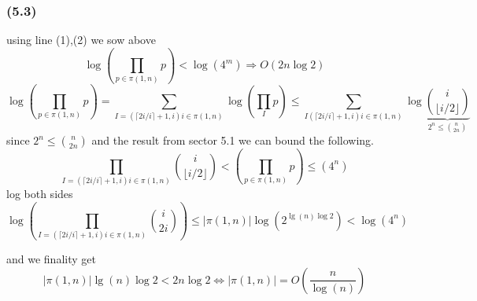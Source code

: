 \documentclass[12pt]{article}
\begin{document}
\subsubsection*{(5.3)}
using line (1),(2) we sow above 
\[ \log\left(\prod\limits_{p\in \pi(1,n)}p\right)< \log(4^m) \Rightarrow O(2n\log 2)
\]
\[
\log\left(\prod\limits_{p\in \pi(1,n)}p\right)= \sum_{ I=(\lceil2i/i\rceil+1,i)i\in \pi(1,n)}\log\left(\prod\limits_{I}p\right)
\leq \sum_{ I(\lceil2i/i\rceil+1,i)i\in \pi(1,n)}
\log\underbrace{{i \choose {\lfloor i/2 \rfloor}}}_{2^n\leq \binom{n}{2n}}
\]
since $2^n\leq \binom{n}{2n}$ and the result from sector 5.1 we can bound the following.
\[
\prod_{ I=(\lceil2i/i\rceil+1,i)i\in \pi(1,n)}{{i \choose {\lfloor i/2 \rfloor}}}  <
\left(\prod\limits_{p\in \pi(1,n)}p\right)\leq (4^n)  \]
log both sides
\[
\log(\prod_{ I=(\lceil2i/i\rceil+1,i)i\in \pi(1,n)} \binom{i}{2i}) \leq |\pi(1,n)|\log(2^{\lg(n)\log2}) < \log(4^n)
\]

and we finality get\[ |\pi(1,n)|\lg(n)\log2 < 2n\log2 \Leftrightarrow |\pi(1,n)|=O(\dfrac{n}{\log(n)})
\]
\end{document}
